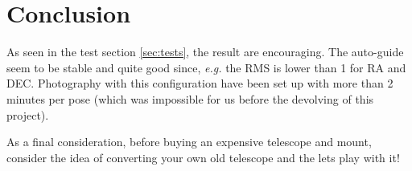 \section{Conclusion}
As seen in the test section \ref{sec:tests}, the result are encouraging.
The auto-guide seem to be stable and quite good since, \textit{e.g.} the RMS is lower than 1 for RA and DEC.
Photography with this configuration have been set up with more than 2 minutes per pose (which was impossible for us before the devolving of this project).

As a final consideration, before buying an expensive telescope and mount, consider the idea of converting your own old telescope and the lets play with it! 